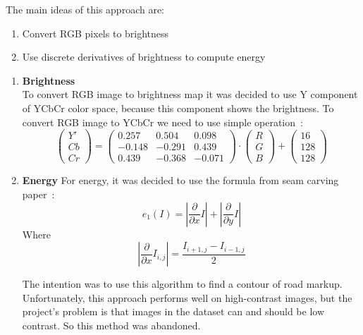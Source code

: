 The main ideas of this approach are:
\begin{enumerate}
    \item Convert RGB pixels to brightness
    \item Use discrete derivatives of brightness to compute energy
\end{enumerate}
\begin{enumerate}
    \item \textbf{Brightness}\\
To convert RGB image to brightness map it was decided to use Y 
component of YCbCr color space, because this component shows the 
brightness. To convert RGB image to YCbCr we need to use simple 
operation~\cite{YCbCr}:
\[\begin{pmatrix}
    Y' \\
    Cb \\
    Cr
\end{pmatrix} = 
\begin{pmatrix}
    0.257 & 0.504 & 0.098 \\
    -0.148 & -0.291 & 0.439 \\
    0.439 & -0.368 & -0.071
\end{pmatrix} \cdot
\begin{pmatrix}
    R \\
    G \\
    B
\end{pmatrix} + 
\begin{pmatrix}
    16 \\
    128 \\
    128
\end{pmatrix}\]
\item \textbf{Energy}
For energy, it was decided to use the formula from 
seam carving paper~\cite{seamcarving}:
\[e_1(I) = |\frac{\partial}{\partial x} I| + |\frac{\partial}{\partial y} I|\]
Where 
\[|\frac{\partial}{\partial x} I_{i,j}| = \frac{I_{i+1,j} - I_{i-1,j}}{2}\]

The intention was to use this algorithm to find a contour of road markup. 
Unfortunately, this approach performs well on high-contrast images, but the project's problem is that images in the dataset 
can and should be low contrast. So this method was abandoned.
\end{enumerate}

